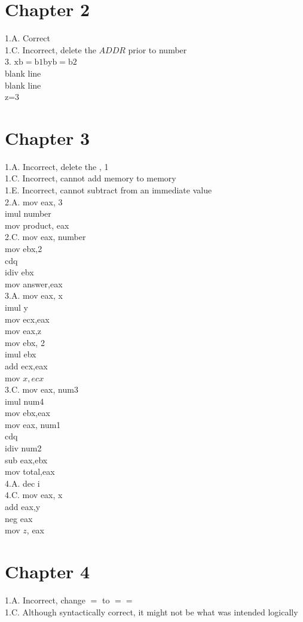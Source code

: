 \documentclass[10pt]{book}
\begin{document}
\begin{center}
\begin{center}
\begin{center}
\begin{center}
\begin{center}
\section*{Chapter 2}
1.A. Correct\\
1.C. Incorrect, delete the $A D D R$ prior to number\\
3. $\mathrm{xb}=\mathrm{b} 1 \mathrm{byb}=\mathrm{b} 2$\\
blank line\\
blank line\\
z=3

\section*{Chapter 3}
1.A. Incorrect, delete the , 1\\
1.C. Incorrect, cannot add memory to memory\\
1.E. Incorrect, cannot subtract from an immediate value\\
2.A. mov eax, 3\\
imul number\\
mov product, eax\\
2.C. mov eax, number\\
mov ebx,2\\
cdq\\
idiv ebx\\
mov answer,eax\\
3.A. mov eax, x\\
imul y\\
mov ecx,eax\\
mov eax,z\\
mov ebx, 2\\
imul ebx\\
add ecx,eax\\
mov $x, e c x$\\
3.C. mov eax, num3\\
imul num4\\
mov ebx,eax\\
mov eax, num1\\
cdq\\
idiv num2\\
sub eax,ebx\\
mov total,eax\\
4.A. dec i\\
4.C. mov eax, x\\
add eax,y\\
neg eax\\
mov $z$, eax

\section*{Chapter 4}
1.A. Incorrect, change $=$ to $==$\\
1.C. Although syntactically correct, it might not be what was intended logically



\end{center}
\end{center}
\end{center}
\end{center}
\end{center}
\end{document}
